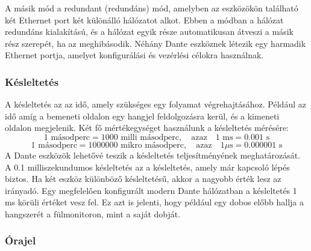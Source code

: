 A másik mód a redundant (redundáns) mód, amelyben az eszközökön található két
Ethernet port két különálló hálózatot alkot. Ebben a módban a hálózat redundáns
kialakítású, és a hálózat egyik része automatikusan átveszi a másik rész szerepét,
ha az meghibásodik.
Néhány Dante eszköznek létezik egy harmadik Ethernet portja, amelyet konfigurálási
és vezérlési célokra használnak.
\subsubsection{Késleltetés}
A késleltetés az az idő, amely szükséges egy folyamat végrehajtásához. Például
az idő amíg a bemeneti oldalon egy hangjel feldolgozásra kerül, és a kimeneti
oldalon megjelenik. 
Két fő mértékegységet használunk a késleltetés mérésére:
\begin{equation}
	\label{eq:milliseconds}
	1 \text{ másodperc} = 1000 \text{ milli másodperc}, \quad \text{azaz} \quad 1 \text{ ms} = 0.001 \text{ s}
\end{equation}
\begin{equation}
	\label{eq:microseconds}
	1 \text{ másodperc} = 1000000 \text{ mikro másodperc}, \quad \text{azaz} \quad 1 \mu\text{s} = 0.000001 \text{ s}
\end{equation}
A Dante eszközök lehetővé teszik a késleltetés teljesítményének meghatározását. 
A 0.1 milliszekundumos késleltetés az a késleltetés, amely már kapcsoló lépés biztos.
Ha két eszköz különböző késleltetésű, akkor a nagyobb érték lesz az irányadó.
Egy megfelelően konfigurált modern Dante hálózatban a késleltetés 1 ms körüli értéket vesz fel.
Ez azt is jelenti, hogy például egy dobos előbb hallja a hangszerét a fülmonitoron, mint a saját dobját.

\subsubsection{Órajel}

